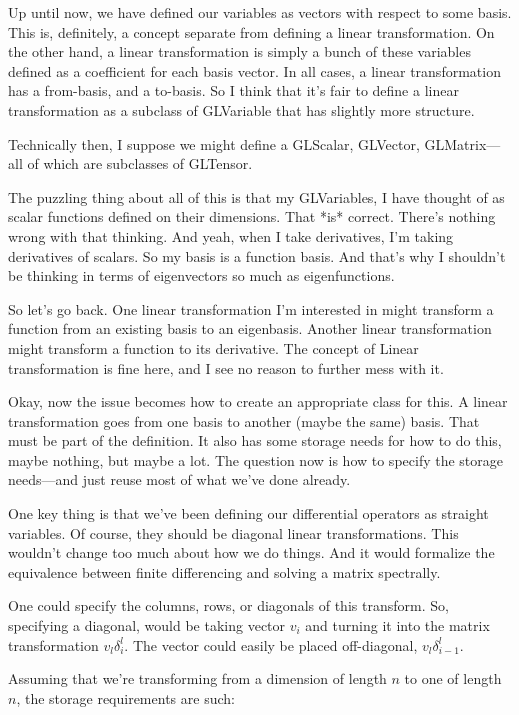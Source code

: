 \documentclass[11pt]{article}
\begin{document}
Up until now, we have defined our variables as vectors with respect to some basis. This is, definitely, a concept separate from defining a linear transformation. On the other hand, a linear transformation is simply a bunch of these variables defined as a coefficient for each basis vector. In all cases, a linear transformation has a from-basis, and a to-basis. So I think that it's fair to define a linear transformation as a subclass of GLVariable that has slightly more structure.

Technically then, I suppose we might define a GLScalar, GLVector, GLMatrix---all of which are subclasses of GLTensor.

The puzzling thing about all of this is that my GLVariables, I have thought of as scalar functions defined on their dimensions. That *is* correct. There's nothing wrong with that thinking. And yeah, when I take derivatives, I'm taking derivatives of scalars. So my basis is a function basis. And that's why I shouldn't be thinking in terms of eigenvectors so much as eigenfunctions.

So let's go back. One linear transformation I'm interested in might transform a function from an existing basis to an eigenbasis. Another linear transformation might transform a function to its derivative. The concept of Linear transformation is fine here, and I see no reason to further mess with it.

Okay, now the issue becomes how to create an appropriate class for this. A linear transformation goes from one basis to another (maybe the same) basis. That must be part of the definition. It also has some storage needs for how to do this, maybe nothing, but maybe a lot. The question now is how to specify the storage needs---and just reuse most of what we've done already.

One key thing is that we've been defining our differential operators as straight variables. Of course, they should be diagonal linear transformations. This wouldn't change too much about how we do things. And it would formalize the equivalence between finite differencing and solving a matrix spectrally.

One could specify the columns, rows, or diagonals of this transform. So, specifying a diagonal, would be taking vector $v_i$ and turning it into the matrix transformation $v_l \delta^l_i$. The vector could easily be placed off-diagonal, $v_l \delta^l_{i-1}$.

Assuming that we're transforming from a dimension of length $n$ to one of length $n$, the storage requirements are such:
\end{document}
